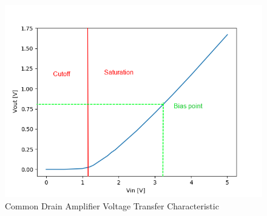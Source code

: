\FloatBarrier

\begin{figure}[h!]
	\centering
	\includegraphics[scale=0.50]{../data/common_drain.png}
	\caption{Common Drain Amplifier Voltage Transfer Characteristic}
	\label{fig:common_drain}
\end{figure}

\FloatBarrier


